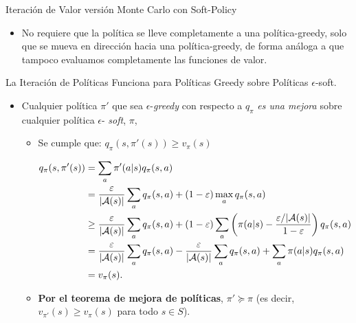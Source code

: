 \documentclass[10pt, envcountsect, handout, aspectratio=1610, hyperref={hypertexnames=true}]{beamer}
\begin{document}
\begin{frame}{Iteración de Valor versión Monte Carlo con Soft-Policy}{\cite{Sutton2018}}
\begin{itemize}
\begin{itemize}
		\end{itemize}
		
		
		
		
		\item {} No requiere que la política se lleve completamente a una política-greedy, solo que se mueva en dirección hacia una política-greedy, de forma análoga a que tampoco evaluamos completamente las funciones de valor.
	\end{itemize}
	

\end{frame}






\begin{frame}{La Iteración de Políticas Funciona para Políticas Greedy sobre Políticas \(\epsilon\)-soft.}
	
	
	\begin{itemize}
		\item {Cualquier política} $\pi'$ que sea \(\epsilon\)-\textit{\color{blue}greedy} con respecto a \(q_\pi\) \textit{\color{blue} es una mejora} sobre cualquier política \(\epsilon\)-\textit{\color{blue} soft}, \(\pi\), 
		
		\begin{itemize}
			\item Se cumple que: $q_\pi(s, \pi'(s)) \geq  v_\pi(s)$
			
			{\footnotesize
				\begin{align*}
					q_\pi(s, \pi'(s)) &= \sum_a \pi'(a|s) q_\pi(s, a) \notag \\
					&= \frac{\varepsilon}{|\mathcal{A}(s)|} \sum_a q_\pi(s, a) + (1 - \varepsilon) \max_a q_\pi(s, a)  \\
					&\geq \frac{\varepsilon}{|\mathcal{A}(s)|} \sum_a q_\pi(s, a) + (1 - \varepsilon) \sum_a \left(\pi(a|s) - \frac{\varepsilon / |\mathcal{A}(s)|}{1 - \varepsilon}\right) q_\pi(s, a) \notag \\
					&= \frac{\varepsilon}{|\mathcal{A}(s)|} \sum_a q_\pi(s, a) - \frac{\varepsilon}{|\mathcal{A}(s)|} \sum_a q_\pi(s, a) + \sum_a \pi(a|s) q_\pi(s, a) \\
					&= v_\pi(s).
				\end{align*}
			}
			
			\item\textbf{ Por el teorema de mejora de políticas}, \(\pi' \succeq \pi\) (es decir, \(v_{\pi'}(s) \geq v_\pi(s)\) para todo \(s \in S\)).
			

\end{itemize}
\end{itemize}
\end{frame}
\end{document}
